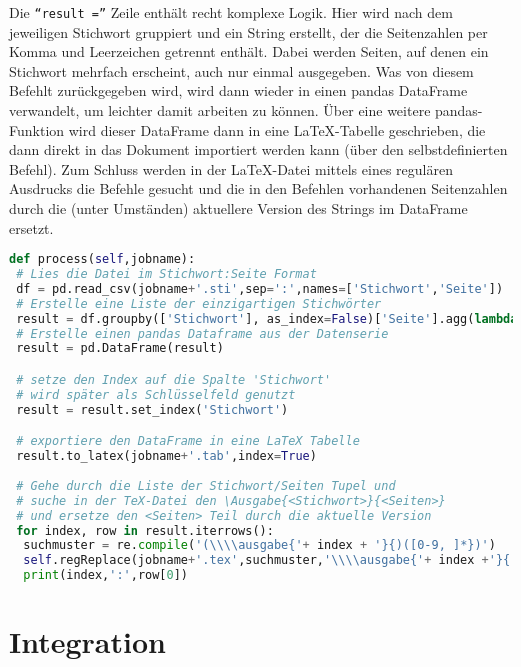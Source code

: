 \documentclass[ngerman]{dtk}
\newcommand{\ausgabe}[2]{#2}
\begin{document}
Die \texttt{\enquote{result =}} Zeile enthält recht komplexe Logik. Hier wird nach dem jeweiligen Stichwort gruppiert und ein String erstellt, der die Seitenzahlen per Komma und Leerzeichen getrennt enthält. Dabei werden Seiten, auf denen ein Stichwort mehrfach erscheint, auch nur einmal ausgegeben.  Was von diesem Befehlt zurückgegeben wird, wird dann wieder in einen pandas DataFrame verwandelt, um leichter damit arbeiten zu können. Über eine weitere pandas-Funktion wird dieser DataFrame dann in eine \LaTeX-Tabelle geschrieben, die dann direkt in das Dokument importiert werden kann (über den selbstdefinierten  Befehl). Zum Schluss werden in der \LaTeX-Datei mittels eines regulären Ausdrucks die  Befehle gesucht und die in den Befehlen vorhandenen Seitenzahlen durch die (unter Umständen) aktuellere Version des Strings im DataFrame ersetzt.

\begin{lstlisting}[language=Python,caption={Auszug aus dem Python-Code},label={lis:py}]
def process(self,jobname):
 # Lies die Datei im Stichwort:Seite Format
 df = pd.read_csv(jobname+'.sti',sep=':',names=['Stichwort','Seite'])
 # Erstelle eine Liste der einzigartigen Stichwörter
 result = df.groupby(['Stichwort'], as_index=False)['Seite'].agg(lambda x: ', '.join(np.unique(x).astype(str)))
 # Erstelle einen pandas Dataframe aus der Datenserie
 result = pd.DataFrame(result) 

 # setze den Index auf die Spalte 'Stichwort'
 # wird später als Schlüsselfeld genutzt
 result = result.set_index('Stichwort') 

 # exportiere den DataFrame in eine LaTeX Tabelle
 result.to_latex(jobname+'.tab',index=True)
        
 # Gehe durch die Liste der Stichwort/Seiten Tupel und
 # suche in der TeX-Datei den \Ausgabe{<Stichwort>}{<Seiten>}
 # und ersetze den <Seiten> Teil durch die aktuelle Version
 for index, row in result.iterrows():
  suchmuster = re.compile('(\\\\ausgabe{'+ index + '}{)([0-9, ]*})')
  self.regReplace(jobname+'.tex',suchmuster,'\\\\ausgabe{'+ index +'}{' + row[0]+'}')
  print(index,':',row[0])
\end{lstlisting}

\section{Integration}
\end{document}
